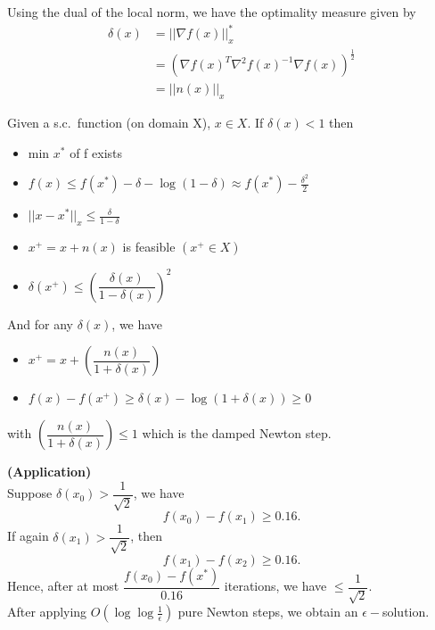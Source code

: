 Using the dual of the local norm, we have the optimality measure given by
\begin{align*}
\delta(x) &= ||\nabla f(x)||^*_x \\
& = (\nabla f(x)^T \nabla^2f(x)^{-1}\nabla f(x))^{\frac{1}{2}} \\
&= ||n(x)||_x
\end{align*}

\begin{property}
Given a s.c.\ function (on domain X), $x\in X$. If $\delta(x) < 1$ then 
\begin{itemize}
\item min $x^*$ of f exists
\item $f(x) \leq f(x^*) - \delta - \log{(1-\delta)} \approx f(x^*) - \frac{\delta^2}{2}$
\item $||x-x^*||_x \leq \frac{\delta}{1 - \delta} $
\item $x^+ = x + n(x)$ is feasible $(x^+ \in X)$
\item $\delta(x^+) \leq \left(\dfrac{\delta(x)}{1-\delta(x)}\right)^2 $\\
\end{itemize}
And for any $\delta(x)$, we have 
\begin{itemize}
\item $x^+ = x + \left(\dfrac{n(x)}{1+\delta(x)}\right) $
\item $f(x) - f(x^+) \geq \delta(x) - \log{(1+\delta(x))} \geq 0 $
\end{itemize}
with $\left(\dfrac{n(x)}{1+\delta(x)}\right) \le 1$ which is the damped Newton step.
\end{property}

\begin{example}
\begin{leftbar}
\textbf{(Application)}\\ 
Suppose $\delta(x_0) > \dfrac{1}{\sqrt{2}}$, we have $$f(x_0) - f(x_1) \geq 0.16.$$ 
If again $\delta(x_1) > \dfrac{1}{\sqrt{2}}$, then $$f(x_1) - f(x_2) \geq 0.16.$$ Hence, after at most $\dfrac{f(x_0) - f(x^*)}{0.16}$ iterations, we have $\leq \dfrac{1}{\sqrt{2}}$. \\
After applying $O(\log{\log{\frac{1}{\epsilon}}})$ pure Newton steps, we obtain an $\epsilon-$solution.
\end{leftbar}
\end{example}

%
